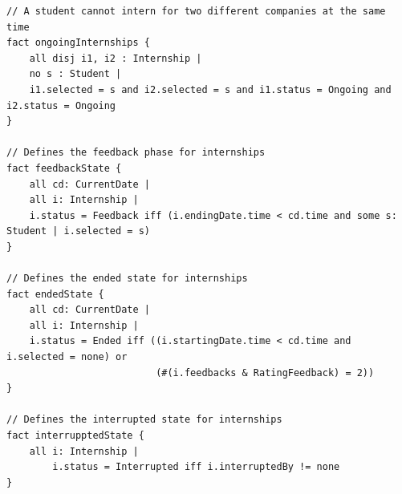 \documentclass{article}
\begin{document}
\begin{lstlisting}
// A student cannot intern for two different companies at the same time
fact ongoingInternships {
    all disj i1, i2 : Internship |
    no s : Student | 
    i1.selected = s and i2.selected = s and i1.status = Ongoing and i2.status = Ongoing
}

// Defines the feedback phase for internships
fact feedbackState {
    all cd: CurrentDate |
    all i: Internship |
    i.status = Feedback iff (i.endingDate.time < cd.time and some s: Student | i.selected = s)
}

// Defines the ended state for internships
fact endedState {
    all cd: CurrentDate |
    all i: Internship | 
    i.status = Ended iff ((i.startingDate.time < cd.time and i.selected = none) or 
                          (#(i.feedbacks & RatingFeedback) = 2))
}

// Defines the interrupted state for internships
fact interrupptedState {
    all i: Internship | 
        i.status = Interrupted iff i.interruptedBy != none 
}
\end{lstlisting}
\end{document}
